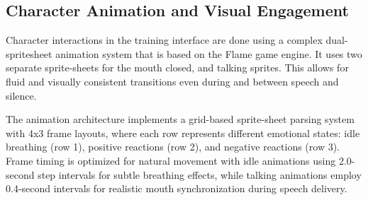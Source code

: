 \documentclass[MScCS]{uccthesis}
\begin{document}
\subsection{Character Animation and Visual Engagement}

Character interactions in the training interface are done using a complex dual-spritesheet animation system that is based on the Flame game engine. It uses two separate sprite-sheets for the mouth closed, and talking sprites. This allows for fluid and visually consistent transitions even during and between speech and silence.

The animation architecture implements a grid-based sprite-sheet parsing system with 4x3 frame layouts, where each row represents different emotional states: idle breathing (row 1), positive reactions (row 2), and negative reactions (row 3). Frame timing is optimized for natural movement with idle animations using 2.0-second step intervals for subtle breathing effects, while talking animations employ 0.4-second intervals for realistic mouth synchronization during speech delivery.
\end{document}
